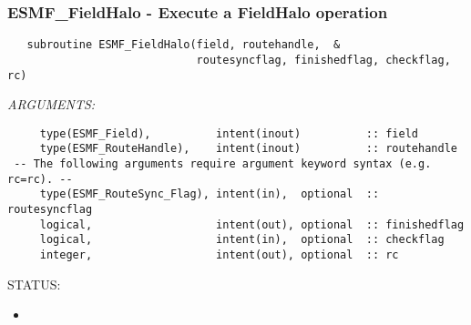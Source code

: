  
\setlength{\oldparskip}{\parskip}
\setlength{\parskip}{1.5ex}
\setlength{\oldparindent}{\parindent}
\setlength{\parindent}{0pt}
\setlength{\oldbaselineskip}{\baselineskip}
\setlength{\baselineskip}{11pt}
 
\def\bv{\begin{verbatim}}
\def\ev{\end{verbatim}}
\def\be{\begin{equation}}
\def\ee{\end{equation}}
\def\bea{\begin{eqnarray}}
\def\eea{\end{eqnarray}}
\def\bi{\begin{itemize}}
\def\ei{\end{itemize}}
\def\bn{\begin{enumerate}}
\def\en{\end{enumerate}}
\def\bd{\begin{description}}
\def\ed{\end{description}}
\def\({\left (}
\def\){\right )}
\def\[{\left [}
\def\]{\right ]}
\def\<{\left  \langle}
\def\>{\right \rangle}
\def\cI{{\cal I}}
\def\diag{\mathop{\rm diag}}
\def\tr{\mathop{\rm tr}}


 
\subsubsection [ESMF\_FieldHalo] {ESMF\_FieldHalo - Execute a FieldHalo operation}


  
\begin{verbatim}   subroutine ESMF_FieldHalo(field, routehandle,  &
                             routesyncflag, finishedflag, checkflag, rc)\end{verbatim}{\em ARGUMENTS:}
\begin{verbatim}     type(ESMF_Field),          intent(inout)          :: field
     type(ESMF_RouteHandle),    intent(inout)          :: routehandle
 -- The following arguments require argument keyword syntax (e.g. rc=rc). --
     type(ESMF_RouteSync_Flag), intent(in),  optional  :: routesyncflag
     logical,                   intent(out), optional  :: finishedflag
     logical,                   intent(in),  optional  :: checkflag
     integer,                   intent(out), optional  :: rc\end{verbatim}
{\sf STATUS:}
   \begin{itemize}
   \item{}
   \end{itemize}
  
